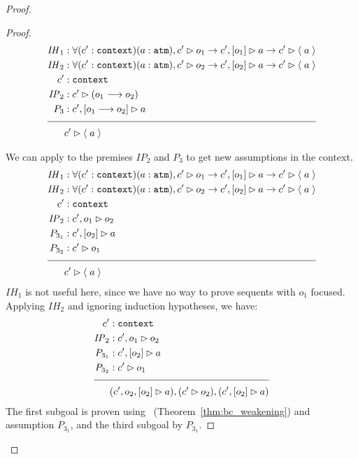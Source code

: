 \begin{proof}
\begin{proof}
\begin{align*}
\mathit{IH}_1 &: \forall (\inddyncon{} : \sltm{context}) (a : \sltm{atm}), \seqsl[\inddyncon{}]{o_1} \rightarrow \bchsl[\inddyncon{}]{o_1}{a} \rightarrow \seqsl[\inddyncon{}]{\atom{a}} \\
\mathit{IH}_2 &: \forall (\inddyncon{} : \sltm{context}) (a : \sltm{atm}), \seqsl[\inddyncon{}]{o_2} \rightarrow \bchsl[\inddyncon{}]{o_2}{a} \rightarrow \seqsl[\inddyncon{}]{\atom{a}} \\
\inddyncon{} &: \sltm{context} \\
\mathit{IP}_2 &: \seqsl[\inddyncon{}]{(o_1 \longrightarrow o_2)} \\
P_3 &: \bchsl[\inddyncon{}]{o_1 \longrightarrow o_2}{a} \\[\pfshift{}]
\cline{1-2}
& \seqsl[\inddyncon{}]{\atom{a}}
\end{align*}

We can apply  to the premises $\mathit{IP}_2$ and $P_3$ to get new assumptions in the context.
\begin{align*}
\mathit{IH}_1 &: \forall (\inddyncon{} : \sltm{context}) (a : \sltm{atm}), \seqsl[\inddyncon{}]{o_1} \rightarrow \bchsl[\inddyncon{}]{o_1}{a} \rightarrow \seqsl[\inddyncon{}]{\atom{a}} \\
\mathit{IH}_2 &: \forall (\inddyncon{} : \sltm{context}) (a : \sltm{atm}), \seqsl[\inddyncon{}]{o_2} \rightarrow \bchsl[\inddyncon{}]{o_2}{a} \rightarrow \seqsl[\inddyncon{}]{\atom{a}} \\
\inddyncon{} &: \sltm{context} \\
\mathit{IP}_2 &: \seqsl[\inddyncon{}, o_1]{o_2} \\
P_{3_1} &: \bchsl[\inddyncon{}]{o_2}{a} \\
P_{3_2} &: \seqsl[\inddyncon{}]{o_1} \\[\pfshift{}]
\cline{1-2}
& \seqsl[\inddyncon{}]{\atom{a}}
\end{align*}
$\mathit{IH}_1$ is not useful here, since we have no way to prove sequents with $o_1$ focused. Applying $\mathit{IH}_2$ and ignoring induction hypotheses, we have:
\begin{align*}
\inddyncon{} &: \sltm{context} \\
\mathit{IP}_2 &: \seqsl[\inddyncon{}, o_1]{o_2} \\
P_{3_1} &: \bchsl[\inddyncon{}]{o_2}{a} \\
P_{3_2} &: \seqsl[\inddyncon{}]{o_1} \\[\pfshift{}]
\cline{1-2}
& (\bchsl[\inddyncon{}, o_2]{o_2}{a}), (\seqsl[\inddyncon{}]{o_2}), (\bchsl[\inddyncon{}]{o_2}{a}) 
\end{align*}
The first subgoal is proven using~ (Theorem~\ref{thm:bc_weakening}) and assumption $P_{3_1}$, and the third subgoal by $P_{3_1}$.


\end{proof}
\end{proof}
